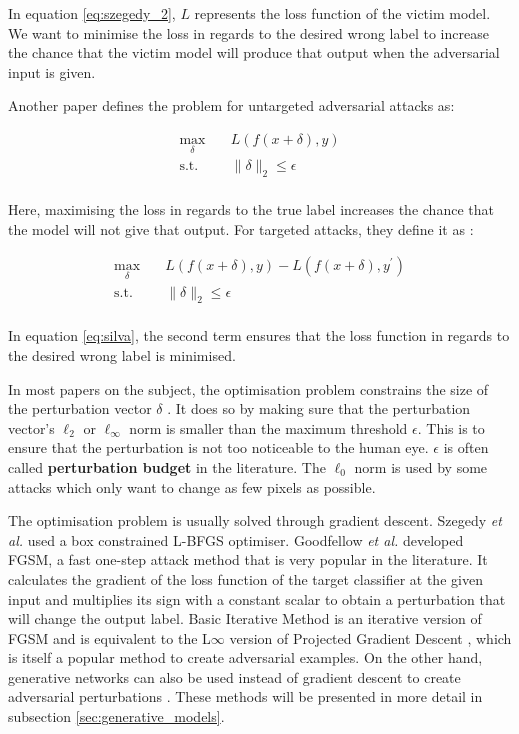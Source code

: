 In equation \ref{eq:szegedy_2}, $L$ represents the loss function of the victim model. We want to minimise the loss in regards to the desired wrong label to increase the chance that the victim model will produce that output when the adversarial input is given.

Another paper \cite{silva_survey} defines the problem for untargeted adversarial attacks as:

\begin{equation}
\begin{aligned}
\max_{\delta} \quad & L(f(x + \delta), y)\\
\textrm{s.t.} \quad& \|\delta\|_2\leq\epsilon   \\
\end{aligned}
\end{equation}

Here, maximising the loss in regards to the true label increases the chance that the model will not give that output. For targeted attacks, they define it as :

\begin{equation}
\label{eq:silva}
\begin{aligned}
\max_{\delta} \quad & L(f(x + \delta), y) - L(f(x + \delta), y^\prime)\\
\textrm{s.t.} \quad& \|\delta\|_2\leq\epsilon   \\
\end{aligned}
\end{equation}

In equation \ref{eq:silva}, the second term ensures that the loss function in regards to the desired wrong label is minimised.

In most papers on the subject, the optimisation problem constrains the size of the perturbation vector $\delta$ \cite{akhtar, silva_survey, tnnls_survey}. It does so by making sure that the perturbation vector's $\ell_2$ or $\ell_\infty$ norm is smaller than the maximum threshold $\epsilon$. This is to ensure that the perturbation is not too noticeable to the human eye. $\epsilon$ is often called \textbf{perturbation budget} in the literature. The $\ell_0$ norm is used by some attacks \cite{akhtar} which only want to change as few pixels as possible. 

The optimisation problem is usually solved through gradient descent. Szegedy \textit{et al.} \cite{szegedy2014intriguing} used a box constrained L-BFGS optimiser. Goodfellow \textit{et al.} \cite{fgsm} developed FGSM, a fast one-step attack method that is very popular in the literature. It calculates the gradient of the loss function of the target classifier at the given input and multiplies its sign with a constant scalar to obtain a perturbation that will change the output label.  Basic Iterative Method is an iterative version of FGSM \cite{kurakin2016adversarial} and is equivalent to the L$\infty$ version of Projected Gradient Descent \cite{madry2019deep}, which is itself a popular method to create adversarial examples. On the other hand, generative networks can also be used instead of gradient descent to create adversarial perturbations \cite{upset_angri, zheng_black_box_GAN, advGAN}. These methods will be presented in more detail in subsection \ref{sec:generative_models}. 

